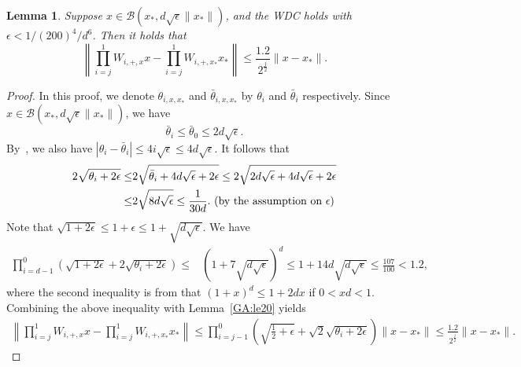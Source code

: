 \documentclass[11pt]{article}
\newtheorem{lemma}[theorem]{Lemma}
\begin{document}


\begin{lemma} \label{GA:le19}
Suppose $x \in \mathcal{B}(x_*, d \sqrt{\epsilon} \|x_*\|)$, and
the WDC
holds with $\epsilon < 1/ (200)^4 / d^6$. Then it holds that
\begin{equation*}
\left\|\prod_{i = j}^1 W_{i, +, x} x - \prod_{i = j}^1 W_{i, +, x_*} x_*\right\| \leq \frac{1.2}{2^{\frac{j}{2}}} \|x - x_*\|.
\end{equation*}
\end{lemma}
\begin{proof}
In this proof, we denote $\theta_{i, x, x_*}$ and $\bar{\theta}_{i, x, x_*}$ by $\theta_i$ and $\bar{\theta}_{i}$ respectively.
Since $x \in \mathcal{B}(x_*, d \sqrt{\epsilon} \|x_*\|)$, we have
\begin{equation} \label{GA:e40}
\bar{\theta}_{i} \leq \bar{\theta}_{0} \leq 2 d \sqrt{\epsilon}.
\end{equation}
By~\cite[(14)]{hand_global_2017}, we also have
$|\theta_{i} - \bar{\theta}_{i}| \leq 4 i \sqrt{\epsilon} \leq 4 d \sqrt{\epsilon}$.
It follows that
\begin{align}
2 \sqrt{\theta_i + 2 \epsilon} \leq& 2 \sqrt{\bar{\theta}_i + 4 d \sqrt{\epsilon} + 2\epsilon} \leq 2 \sqrt{2 d \sqrt{\epsilon} + 4 d \sqrt{\epsilon} + 2\epsilon} \nonumber \\
\leq& 2 \sqrt{8 d \sqrt{\epsilon}} \leq \frac{1}{30 d}. \hbox{ (by the assumption on $\epsilon$)} \label{GA:e39}
\end{align}
Note that $\sqrt{1 + 2 \epsilon} \leq 1 + \epsilon \leq 1 + \sqrt{d\sqrt{\epsilon}}$. We have
\begin{align*}
\prod_{i = d - 1}^0 \left( \sqrt{1+2\epsilon} + 2 \sqrt{ \theta_i + 2 \epsilon} \right) \leq& \left(1 + 7 \sqrt{d\sqrt{\epsilon}}\right)^d \leq 1 + 14 d \sqrt{d\sqrt{\epsilon}} \leq \frac{107}{100} < 1.2,
\end{align*}
where the second inequality is from that $(1+x)^d \leq 1 + 2dx$ if $0 < x d < 1$.
Combining the above inequality with Lemma~\ref{GA:le20} yields
\begin{align*}
\left\|\prod_{i = j}^1 W_{i, +, x}x - \prod_{i = j}^1 W_{i, +, x_*} x_*\right\| \leq \prod_{i = j - 1}^0 \left( \sqrt{\frac{1}{2}+\epsilon} + \sqrt{2} \sqrt{ \theta_i + 2 \epsilon} \right) \|x - x_*\| \leq \frac{1.2}{2^{\frac{j}{2}}} \|x - x_*\|.
\end{align*}
\end{proof}
\end{document}
